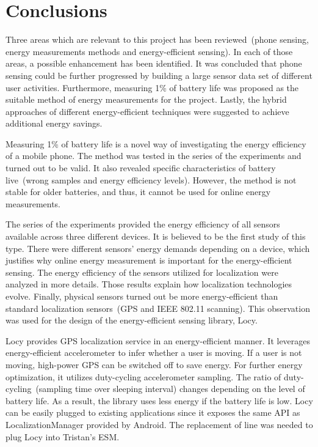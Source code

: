 \section{Conclusions}
\label{s:conc}
Three areas which are relevant to this project has been reviewed\ (phone sensing, energy measurements methods and energy-efficient sensing). In each of those areas, a possible enhancement has been identified. It was concluded that phone sensing could be further progressed by building a large sensor data set of different user activities. Furthermore, measuring 1\% of battery life was proposed as the suitable method of energy measurements for the project. Lastly, the hybrid approaches of different energy-efficient techniques were suggested to achieve additional energy savings. 

Measuring 1\% of battery life is a novel way of investigating the energy efficiency of a mobile phone. The method was tested in the series of the experiments and turned out to be valid. It also revealed specific characteristics of battery live\ (wrong samples and energy efficiency levels). However, the method is not stable for older batteries, and thus, it cannot be used for online energy measurements. 		

The series of the experiments provided the energy efficiency of all sensors available across three different devices. It is believed to be the first study of this type. There were different sensors' energy demands depending on a device, which justifies why online energy measurement is important for the energy-efficient sensing. The energy efficiency of the sensors utilized for localization were analyzed in more details. Those results explain how localization technologies evolve. Finally, physical sensors turned out be more energy-efficient than standard localization sensors\ (GPS and IEEE 802.11 scanning). This observation was used for the design of the energy-efficient sensing library, Locy.

Locy provides GPS localization service in an energy-efficient manner. It leverages energy-efficient accelerometer to infer whether a user is moving. If a user is not moving, high-power GPS can be switched off to save energy.  For further energy optimization, it utilizes duty-cycling accelerometer sampling. The ratio of duty-cycling\ (sampling time over sleeping interval) changes depending on the level of battery life. As a result, the library uses less energy if the battery life is low. Locy can be easily plugged to existing applications since it exposes the same API as LocalizationManager provided by Android. The replacement of line was needed to plug Locy into Tristan's ESM.

